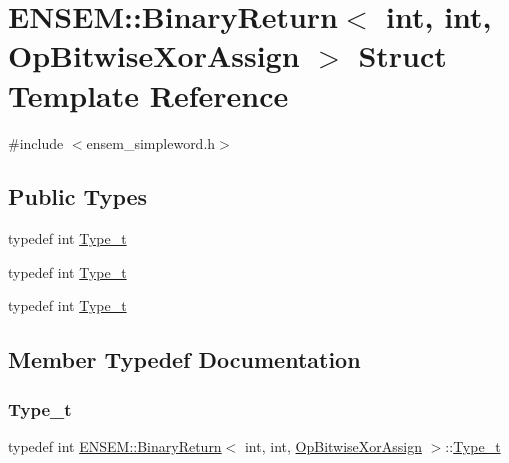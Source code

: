 \hypertarget{structENSEM_1_1BinaryReturn_3_01int_00_01int_00_01OpBitwiseXorAssign_01_4}{}\section{E\+N\+S\+EM\+:\+:Binary\+Return$<$ int, int, Op\+Bitwise\+Xor\+Assign $>$ Struct Template Reference}
\label{structENSEM_1_1BinaryReturn_3_01int_00_01int_00_01OpBitwiseXorAssign_01_4}


{\ttfamily \#include $<$ensem\+\_\+simpleword.\+h$>$}

\subsection*{Public Types}
\begin{DoxyCompactItemize}
\item 
typedef int \mbox{\hyperlink{structENSEM_1_1BinaryReturn_3_01int_00_01int_00_01OpBitwiseXorAssign_01_4_a8ee67fcadda1141739b4054917e9e3d2}{Type\+\_\+t}}
\item 
typedef int \mbox{\hyperlink{structENSEM_1_1BinaryReturn_3_01int_00_01int_00_01OpBitwiseXorAssign_01_4_a8ee67fcadda1141739b4054917e9e3d2}{Type\+\_\+t}}
\item 
typedef int \mbox{\hyperlink{structENSEM_1_1BinaryReturn_3_01int_00_01int_00_01OpBitwiseXorAssign_01_4_a8ee67fcadda1141739b4054917e9e3d2}{Type\+\_\+t}}
\end{DoxyCompactItemize}


\subsection{Member Typedef Documentation}
\mbox{\label{structENSEM_1_1BinaryReturn_3_01int_00_01int_00_01OpBitwiseXorAssign_01_4_a8ee67fcadda1141739b4054917e9e3d2}} 
\subsubsection{\texorpdfstring{Type\_t}{Type\_t}\hspace{0.1cm}{\footnotesize\ttfamily [1/3]}}
{\footnotesize\ttfamily typedef int \mbox{\hyperlink{structENSEM_1_1BinaryReturn}{E\+N\+S\+E\+M\+::\+Binary\+Return}}$<$ int, int, \mbox{\hyperlink{structENSEM_1_1OpBitwiseXorAssign}{Op\+Bitwise\+Xor\+Assign}} $>$\+::\mbox{\hyperlink{structENSEM_1_1BinaryReturn_3_01int_00_01int_00_01OpBitwiseXorAssign_01_4_a8ee67fcadda1141739b4054917e9e3d2}{Type\+\_\+t}}}

